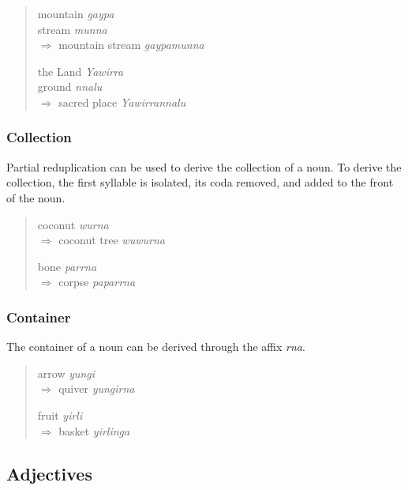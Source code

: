 \begin{quote}
\begin{multicols}{2}
mountain \textit{gaypa}\\
stream \textit{munna}\\
$\Rightarrow$ mountain stream \textit{gaypamunna}

the Land \textit{Yawirra}\\
ground \textit{nnalu}\\
$\Rightarrow$ sacred place \textit{Yawirrannalu}
\end{multicols}
\end{quote}

\subsubsection{Collection}

Partial reduplication can be used to derive the collection of a noun. To derive
the collection, the first syllable is isolated, its coda removed, and added to
the front of the noun.

\begin{quote}
\begin{multicols}{2}
coconut \textit{wurna}\\
$\Rightarrow$ coconut tree \textit{wuwurna}

bone \textit{parrna}\\
$\Rightarrow$ corpse \textit{paparrna}
\end{multicols}
\end{quote}

\subsubsection{Container}

The container of a noun can be derived through the affix \textit{rna}.

\begin{quote}
\begin{multicols}{2}
arrow \textit{yungi}\\
$\Rightarrow$ quiver \textit{yungirna}

fruit \textit{yirli}\\
$\Rightarrow$ basket \textit{yirlinga}
\end{multicols}
\end{quote}

\subsection{Adjectives}

